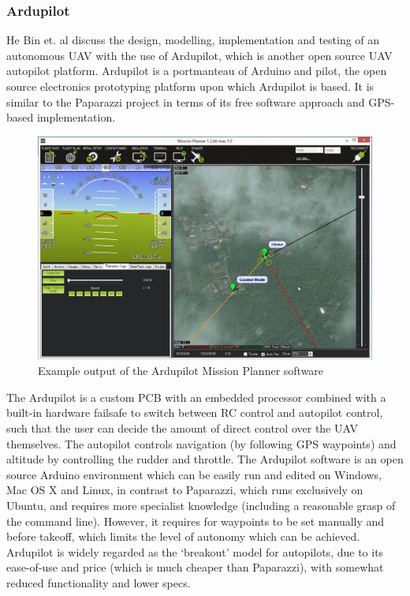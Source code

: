 \subsubsection{Ardupilot}
He Bin et. al \cite{ hebin2009} discuss the design, modelling, implementation and testing of an autonomous UAV with the use of Ardupilot, which is another open source UAV autopilot platform. Ardupilot is a portmanteau of Arduino and pilot, the open source electronics prototyping platform upon which Ardupilot is based. It is similar to the Paparazzi project in terms of its free software approach and GPS-based implementation. 

\begin{figure}
\centering	
\includegraphics[scale=0.2]{img/ardgui}	
\caption{Example output of  the Ardupilot Mission Planner software}
\end{figure}

The Ardupilot is a custom PCB with an embedded processor combined with a built-in hardware failsafe to switch between RC control and autopilot control, such that the user can decide the amount of direct control over the UAV themselves. The autopilot controls navigation (by following GPS waypoints) and altitude by controlling the rudder and throttle.
The Ardupilot software is an open source Arduino environment which can be easily run and edited on Windows, Mac OS X and Linux, in contrast to Paparazzi, which runs exclusively on Ubuntu, and requires more specialist knowledge (including a reasonable grasp of the command line). However, it requires for waypoints to be set manually and before takeoff, which limits the level of autonomy which can be achieved. Ardupilot is widely regarded as the ‘breakout’ model for autopilots, due to its ease-of-use and price (which is much cheaper than Paparazzi), with somewhat reduced functionality and lower specs.

